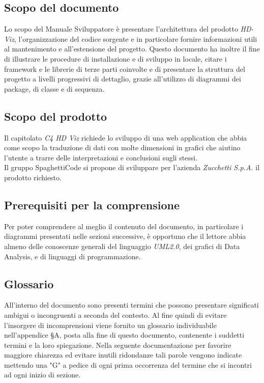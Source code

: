 \documentclass[../manuale_sviluppatore.tex]{subfiles}
\begin{document}
\subsection{Scopo del documento}
\label{sub:scopo_doc}
Lo scopo del Manuale Sviluppatore è presentare l’architettura del prodotto \emph{HD-Viz}, l’organizzazione del codice sorgente e in particolare fornire informazioni utili al mantenimento e all’estensione del progetto. 
Questo documento ha inoltre il fine di  illustrare le procedure di installazione e di sviluppo in locale, citare i framework e le librerie di terze parti coinvolte e di presentare la struttura del progetto a livelli progressivi di dettaglio, grazie all’utilizzo di diagrammi dei package, di classe e di sequenza.

\subsection{Scopo del prodotto}
\label{sub:scopo_prod}
Il capitolato \emph{ C4 HD Viz} richiede lo sviluppo di una web application che abbia come scopo la traduzione di dati con molte dimensioni in grafici che aiutino l’utente a trarre delle interpretazioni e conclusioni sugli stessi. \\
Il gruppo SpaghettiCode si propone di sviluppare per l’azienda \emph{Zucchetti S.p.A.}  il prodotto richiesto.

\subsection{Prerequisiti per la comprensione}
\label{sub:prereq}
Per poter comprendere al meglio il contenuto del documento, in particolare i diagrammi
presentati nelle sezioni successive, è opportuno che il lettore abbia almeno delle conoscenze generali
del linguaggio \emph{UML2.0}, dei grafici di Data Analysis, e di linguaggi di programmazione.  

\subsection{Glossario}
\label{sub:glossario}
All’interno del documento sono presenti termini che possono presentare significati ambigui o incongruenti a seconda del contesto. 
Al fine quindi di evitare l’insorgere di incomprensioni viene fornito un glossario individuabile nell’appendice §A, posta alla fine di questo documento, contenente i suddetti termini e la loro spiegazione. 
Nella seguente documentazione per favorire maggiore chiarezza ed evitare inutili ridondanze tali parole vengono indicate mettendo una "G" a pedice di ogni prima occorrenza del termine che si incontri ad ogni inizio di sezione. 
\end{document}
